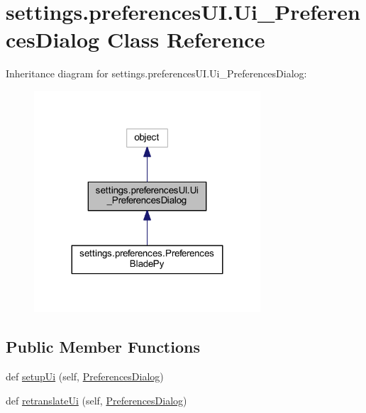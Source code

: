 \hypertarget{classsettings_1_1preferences_u_i_1_1_ui___preferences_dialog}{}\section{settings.\+preferences\+U\+I.\+Ui\+\_\+\+Preferences\+Dialog Class Reference}
\label{classsettings_1_1preferences_u_i_1_1_ui___preferences_dialog}


Inheritance diagram for settings.\+preferences\+U\+I.\+Ui\+\_\+\+Preferences\+Dialog\+:\nopagebreak
\begin{figure}[H]
\begin{center}
\leavevmode
\includegraphics[width=239pt]{classsettings_1_1preferences_u_i_1_1_ui___preferences_dialog__inherit__graph}
\end{center}
\end{figure}
\subsection*{Public Member Functions}
\begin{DoxyCompactItemize}
\item 
def \hyperlink{classsettings_1_1preferences_u_i_1_1_ui___preferences_dialog_a61eadae581e6b31932e65f89ee78760c}{setup\+Ui} (self, \hyperlink{namespacesettings_1_1preferences_u_i_a70162ca377a00273f0795162093f7958}{Preferences\+Dialog})
\item 
def \hyperlink{classsettings_1_1preferences_u_i_1_1_ui___preferences_dialog_a29096d3ca31a6d880f3e4680987243e8}{retranslate\+Ui} (self, \hyperlink{namespacesettings_1_1preferences_u_i_a70162ca377a00273f0795162093f7958}{Preferences\+Dialog})
\end{DoxyCompactItemize}
